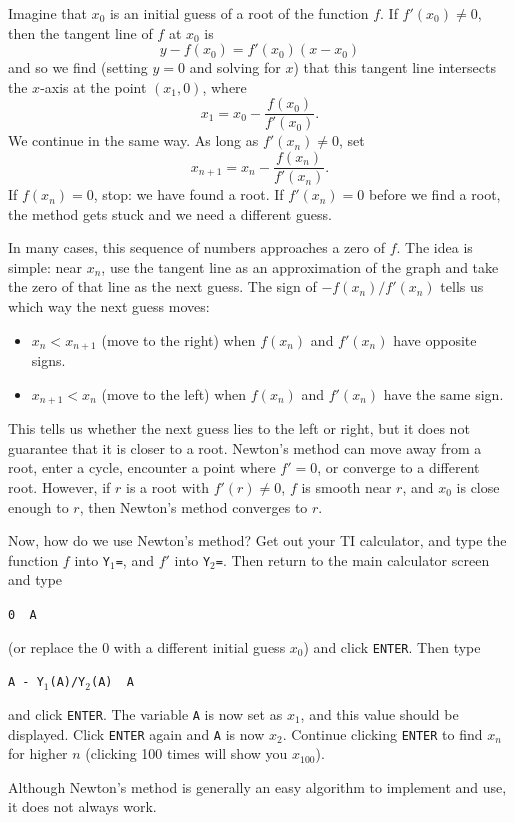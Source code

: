 Imagine that $x_0$ is an initial guess of a root of the function $f$. If $f'(x_0)\ne 0$, then the tangent line of $f$ at $x_0$ is
$$y-f(x_0)=f'(x_0)(x-x_0)$$
and so we find (setting $y=0$ and solving for $x$) that this tangent line intersects the $x$-axis at the point $(x_1,0)$, where
$$x_1=x_0-\frac{f(x_0)}{f'(x_0)}.$$
We continue in the same way. As long as $f'(x_n)\ne0$, set
$$x_{n+1}=x_n-\frac{f(x_n)}{f'(x_n)}.$$
If $f(x_n)=0$, stop: we have found a root. If $f'(x_n)=0$ before we find a root, the method gets stuck and we need a different guess.

In many cases, this sequence of numbers approaches a zero of $f$. The idea is simple: near $x_n$, use the tangent line as an approximation of the graph and take the zero of that line as the next guess. The sign of $-f(x_n)/f'(x_n)$ tells us which way the next guess moves:
\begin{itemize}
\item $x_n<x_{n+1}$ (move to the right) when $f(x_n)$ and $f'(x_n)$ have opposite signs. 
\item $x_{n+1}<x_n$ (move to the left) when $f(x_n)$ and $f'(x_n)$ have the same sign.
\end{itemize}

This tells us whether the next guess lies to the left or right, but it does not guarantee that it is closer to a root. Newton's method can move away from a root, enter a cycle, encounter a point where $f'=0$, or converge to a different root. However, if $r$ is a root with $f'(r)\ne0$, $f$ is smooth near $r$, and $x_0$ is close enough to $r$, then Newton's method converges to $r$.

Now, how do we use Newton's method? Get out your TI calculator, and type the function $f$ into \texttt{Y$_\text{1}$=}, and $f'$ into \texttt{Y$_\text{2}$=}. Then return to the main calculator screen and type
\begin{center}
\texttt{0 \MVRightarrow \ A}
\end{center}
(or replace the 0 with a different initial guess $x_0$) and click \texttt{ENTER}. Then type
\begin{center}
\texttt{A - Y$_\text{1}$(A)/Y$_\text{2}$(A) \MVRightarrow \ A}
\end{center}
and click \texttt{ENTER}. The variable \texttt{A} is now set as $x_1$, and this value should be displayed. Click \texttt{ENTER} again and \texttt{A} is now $x_2$. Continue clicking \texttt{ENTER} to find $x_n$ for higher $n$ (clicking 100 times will show you $x_{100}$).

Although Newton's method is generally an easy algorithm to implement and use, it does not always work.
